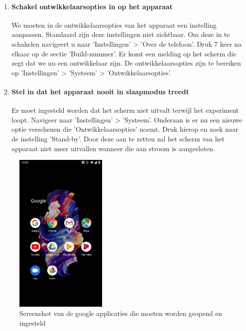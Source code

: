 \begin{enumerate}
    \item
    \paragraph{Schakel ontwikkelaarsopties in op het apparaat}
    \label{itm:developersettings}

    We moeten in de ontwikkelaarsopties van het apparaat een instelling aanpassen. Standaard zijn deze instellingen niet zichtbaar. Om deze in te schakelen navigeert u naar 'Instellingen' > 'Over de telefoon'. Druk 7 keer na elkaar op de sectie 'Build-nummer'. Er komt een melding op het scherm die zegt dat we nu een ontwikkelaar zijn. De ontwikkelaarsopties zijn te bereiken op 'Instellingen' > 'Systeem' > 'Ontwikkelaarsopties'.
    
    \item
    \paragraph{Stel in dat het apparaat nooit in slaapmodus treedt}
    \label{itm:disablesleep}
    
    Er moet ingesteld worden dat het scherm niet uitvalt terwijl het experiment loopt. Navigeer naar 'Instellingen' > 'Systeem'. Onderaan is er nu een nieuwe optie verschenen die 'Ontwikkelaarsopties' noemt. Druk hierop en zoek naar de instelling 'Stand-by'. Door deze aan te zetten zal het scherm van het apparaat niet meer uitvallen wanneer die aan stroom is aangesloten.
\end{enumerate}

\begin{figure}
    \centering
    \includegraphics[width=0.4\textwidth]{img/googleapps.jpg}
    \caption{Screenshot van de google applicaties die moeten worden geopend en ingesteld}
    \label{fig:googleapps}
\end{figure}

